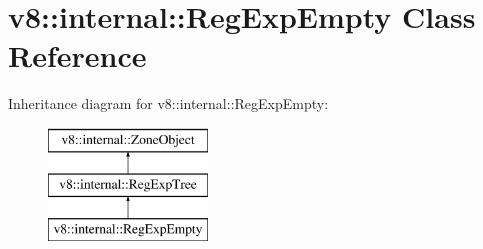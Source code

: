 \hypertarget{classv8_1_1internal_1_1_reg_exp_empty}{}\section{v8\+:\+:internal\+:\+:Reg\+Exp\+Empty Class Reference}
\label{classv8_1_1internal_1_1_reg_exp_empty}
Inheritance diagram for v8\+:\+:internal\+:\+:Reg\+Exp\+Empty\+:\begin{figure}[H]
\begin{center}
\leavevmode
\includegraphics[height=3.000000cm]{classv8_1_1internal_1_1_reg_exp_empty}
\end{center}
\end{figure}
